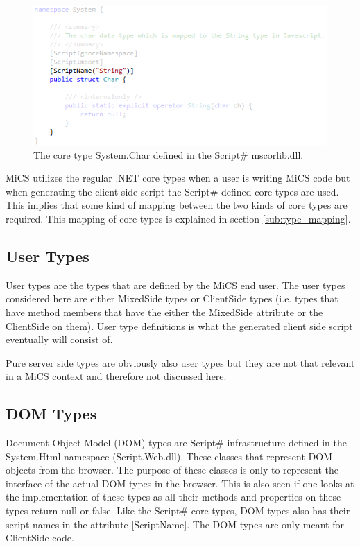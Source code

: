 	\begin{figure}[H]
			\includegraphics[width=13cm]{resources/images/Char.png}
		\caption{The core type System.Char defined in the Script\# mscorlib.dll.}
		\label{char}
	\end{figure}

	MiCS utilizes the regular .NET core types when a user is writing MiCS code but when generating the client side script the Script\# defined core types are used. This implies that some kind of mapping between the two kinds of core types are required. This mapping of core types is explained in section \ref{sub:type_mapping}.

	\subsection{User Types} %
	\label{sub:user_types}
		User types are the types that are defined by the MiCS end user. The user types considered here are either MixedSide types or ClientSide types (i.e. types that have method members that have the either the MixedSide attribute or the ClientSide on them). User type definitions is what the generated client side script eventually will consist of. 

		Pure server side types are obviously also user types but they are not that relevant in a MiCS context and therefore not discussed here.

	\subsection{DOM Types} %
	\label{sub:dom_types}
		Document Object Model (DOM) types are Script\# infrastructure defined in the System.Html namespace (Script.Web.dll). These classes that represent DOM objects from the browser. The purpose of these classes is only to represent the interface of the actual DOM types in the browser. This is also seen if one looks at the implementation of these types as all their methods and properties on these types return null or false. Like the Script\# core types, DOM types also has their script names in the attribute [ScriptName]. The DOM types are only meant for ClientSide code.

